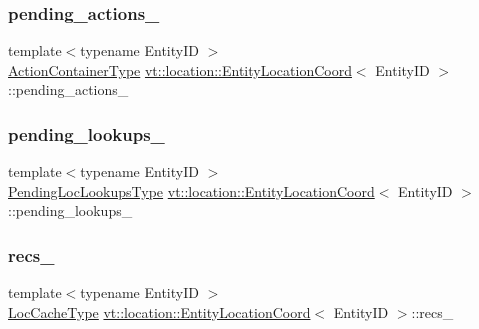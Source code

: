 \subsubsection{\texorpdfstring{pending\+\_\+actions\+\_\+}{pending\_actions\_}}
{\footnotesize\ttfamily template$<$typename Entity\+ID $>$ \\
\hyperlink{structvt_1_1location_1_1_entity_location_coord_afeaaebfc1d7cbdd20cccbd348d96748a}{Action\+Container\+Type} \hyperlink{structvt_1_1location_1_1_entity_location_coord}{vt\+::location\+::\+Entity\+Location\+Coord}$<$ Entity\+ID $>$\+::pending\+\_\+actions\+\_\+\hspace{0.3cm}{\ttfamily [private]}}

\mbox{\label{structvt_1_1location_1_1_entity_location_coord_a321719e0c1c938ef5dc8134ac92849fd}} 
\subsubsection{\texorpdfstring{pending\+\_\+lookups\+\_\+}{pending\_lookups\_}}
{\footnotesize\ttfamily template$<$typename Entity\+ID $>$ \\
\hyperlink{structvt_1_1location_1_1_entity_location_coord_a495c5dfc3aa444524af9aede4b20cfdc}{Pending\+Loc\+Lookups\+Type} \hyperlink{structvt_1_1location_1_1_entity_location_coord}{vt\+::location\+::\+Entity\+Location\+Coord}$<$ Entity\+ID $>$\+::pending\+\_\+lookups\+\_\+\hspace{0.3cm}{\ttfamily [private]}}

\mbox{\label{structvt_1_1location_1_1_entity_location_coord_a4822f7d8be8fd72319ad7a1823cf5fc9}} 
\subsubsection{\texorpdfstring{recs\+\_\+}{recs\_}}
{\footnotesize\ttfamily template$<$typename Entity\+ID $>$ \\
\hyperlink{structvt_1_1location_1_1_entity_location_coord_a8824e120b11c3234534a6dce11fe0c69}{Loc\+Cache\+Type} \hyperlink{structvt_1_1location_1_1_entity_location_coord}{vt\+::location\+::\+Entity\+Location\+Coord}$<$ Entity\+ID $>$\+::recs\+\_\+\hspace{0.3cm}{\ttfamily [private]}}

